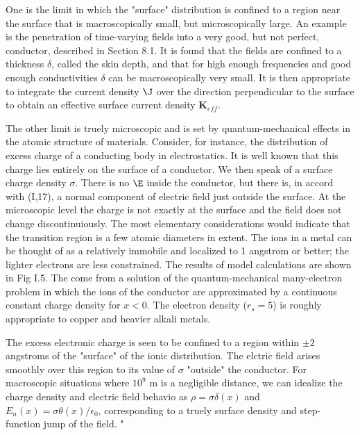 \documentclass[11pt]{article}
\begin{document}
One is the limit in which the "surface" distribution is confined to a region near the surface that is macroscopically small, but microscopically large. An example is the penetration of time-varying fields into a very good, but not perfect, conductor, described in Section 8.1. It is found that the fields are confined to a thickness $\delta$, called the skin depth, and that for high enough frequencies and good enough conductivities $\delta$ can be macroscopically very small. It is then appropriate to integrate the current density $\J$ over the direction perpendicular to the surface to obtain an effective surface current density $\mathbf{K}_{eff}$.

The other limit is truely microscopic and is set by quantum-mechanical effects in the atomic structure of materials. Consider, for instance, the distribution of excess charge of a conducting body in electrostatics. It is well known that this charge lies entirely on the surface of a conductor. We then speak of a surface charge density $\sigma$. There is no $\E$ inside the conductor, but there is, in accord with (I,17), a normal component of electric field just outside the surface. At the microscopic level the charge is not exactly at the surface and the field does not change discontinuiously. The most elementary considerations would indicate that the transition region is a few atomic diameters in extent. The ions in a metal can be thought of as a relatively immobile and localized to 1 angstrom or better; the lighter electrons are less constrained. The results of model calculations are shown in Fig I.5. The come from a solution of the quantum-mechanical many-electron problem in which the ions of the conductor are approximated by a continuous constant charge density for $x<0$. The electron density ($r_s=5$) is roughly appropriate to copper and heavier alkali metals.

The excess electronic charge is seen to be confined to a region within $\pm 2$ angstroms of the "surface" of the ionic distribution. The elctric field arises smoothly over this region to its value of $\sigma$ "outside" the conductor. For macroscopic situations where $10^9$ m is a negligible distance, we can idealize the charge density and electric field behavio as $\rho = \sigma \delta(x)$ and $E_n(x) = \sigma \theta(x)/\epsilon_0$, corresponding to a truely surface density and step-function jump of the field.
"
\end{document}
